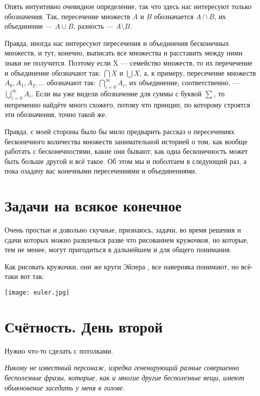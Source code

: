 \documentclass[12pt, onecolumn]{report}
\begin{document}
Опять интуитивно очевидное определение, так что здесь нас интересуют только обозначения. Так, пересечение множеств $A$ и $B$ обозначается $A \cap B$, их объединение --- $A \cup B$, разность --- $A\setminus B$.

Правда, иногда нас интересуют пересечения и объединения бесконечных множеств, и тут, конечно, выписать все множества и расставить между ними знаки не получится. Поэтому если X --- семейство множеств, то их перечечение и объединение обозначают так: $\bigcap X$ и $\bigcup X$, а, к примеру, пересечение множеств $A_0, A_1, A_2, \ldots$ обозначают так:
$\bigcap\limits_{i = 0}^{\infty}{A_i}$, их объединение, соответственно, --- $\bigcup\limits_{i = 0}^{\infty}{A_i}$. Если вы уже видели обозначение для суммы с буквой $\sum$, то непременно найдёте много схожего, потому что принцип, по которому строятся эти обозначения, точно такой же. 

Правда, с моей стороны было бы мило предварить рассказ о пересечениях бесконечного количества множеств занимательной историей о том, как вообще работать с бесконечностями, какие они бывают, как одна бесконечность может быть больше другой и всё такое. Об этом мы и поболтаем в следующий раз, а пока озадачу вас конечными пересечениями и объединениями.

\chapter*{Задачи на всякое конечное}
Очень простые и довольно скучные, признаюсь, задачи, во время решения и сдачи которых можно развлечься разве что рисованием кружочков, но которые, тем не менее, могут пригодиться в дальнейшем и для общего понимания.

Как рисовать кружочки, они же круги Эйлера
, все наверняка понимают, но всё-таки вот так:

\texttt{[image: euler.jpg]}


\chapter{Счётность. День второй}
\begin{flushright}
Нужно что-то сделать с потолками.

{\itshape Никому не известный персонаж, изредка гененирующий разные совершенно бесполезные фразы, которые, как и многие другие бесполезные вещи, имеют обыкновение заседать у меня в голове.}
\end{flushright}
\end{document}
